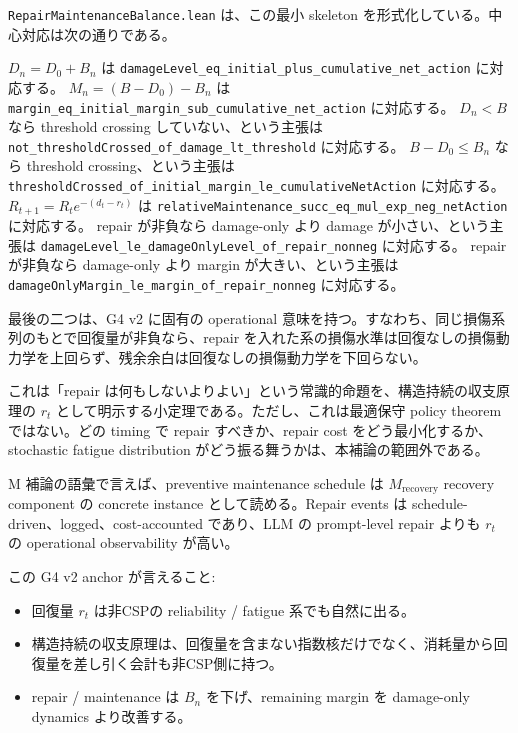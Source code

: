 \documentclass[12pt,a4paper]{article}
\begin{document}
\texttt{RepairMaintenanceBalance.lean} は、この最小 skeleton を形式化している。中心対応は次の通りである。

\(D_{n}=D_0+B_{n}\) は \texttt{damageLevel\_eq\_initial\_plus\_cumulative\_net\_action} に対応する。 \(M_{n}=(B-D_0)-B_{n}\) は \texttt{margin\_eq\_initial\_margin\_sub\_cumulative\_net\_action} に対応する。 \(D_{n}<B\) なら threshold crossing していない、という主張は \texttt{not\_thresholdCrossed\_of\_damage\_lt\_threshold} に対応する。 \(B-D_0\le B_{n}\) なら threshold crossing、という主張は \texttt{thresholdCrossed\_of\_initial\_margin\_le\_cumulativeNetAction} に対応する。 \(R_{t+1}=R_{t} e^{-(d_{t}-r_{t})}\) は \texttt{relativeMaintenance\_succ\_eq\_mul\_exp\_neg\_netAction} に対応する。 repair が非負なら damage-only より damage が小さい、という主張は \texttt{damageLevel\_le\_damageOnlyLevel\_of\_repair\_nonneg} に対応する。 repair が非負なら damage-only より margin が大きい、という主張は \texttt{damageOnlyMargin\_le\_margin\_of\_repair\_nonneg} に対応する。

最後の二つは、G4 v2 に固有の operational 意味を持つ。すなわち、同じ損傷系列のもとで回復量が非負なら、repair を入れた系の損傷水準は回復なしの損傷動力学を上回らず、残余余白は回復なしの損傷動力学を下回らない。

これは「repair は何もしないよりよい」という常識的命題を、構造持続の収支原理の \(r_{t}\) として明示する小定理である。ただし、これは最適保守 policy theorem ではない。どの timing で repair すべきか、repair cost をどう最小化するか、stochastic fatigue distribution がどう振る舞うかは、本補論の範囲外である。

M 補論の語彙で言えば、preventive maintenance schedule は \(M_{\mathrm{recovery}}\) recovery component の concrete instance として読める。Repair events は schedule-driven、logged、cost-accounted であり、LLM の prompt-level repair よりも \(r_{t}\) の operational observability が高い。

この G4 v2 anchor が言えること:

\begin{itemize}
\tightlist
\item
  回復量 \(r_{t}\) は非CSPの reliability / fatigue 系でも自然に出る。
\item
  構造持続の収支原理は、回復量を含まない指数核だけでなく、消耗量から回復量を差し引く会計も非CSP側に持つ。
\item
  repair / maintenance は \(B_{n}\) を下げ、remaining margin を damage-only dynamics より改善する。
\end{itemize}
\end{document}

